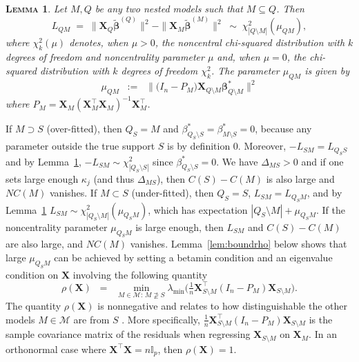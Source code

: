 \documentclass[bj,authoryear]{imsart}
\theoremstyle{plain}
\newtheorem{lem}[thm]{\textsc{Lemma}}
\newcommand{\I}{\mathbb{I}}
\newcommand{\M}{\mathcal{M}}
\newcommand{\bs}{\boldsymbol}
\begin{document}
\begin{lem}\label{lemma:s7}
    Let $M,Q$ be any two nested models such that $M \subseteq Q$. Then
$$
L_{QM}\;=\;\|\bs X_{Q}\tilde{\bs\beta}^{(Q)}\|^2-\|\bs X_{M}\tilde{\bs\beta}^{(M)}\|^2\;\sim\; \chi_{|Q\setminus M|}^2\left(\mu_{Q M}\right), 
$$
where $\chi_{k}^2(\mu)$ denotes, when $\mu>0$, the noncentral chi-squared distribution with $k$ degrees of freedom and noncentrality parameter $\mu$ and, when $\mu=0$, the chi-squared distribution with $k$ degrees of freedom $\chi_{k}^2$. The parameter $\mu_{QM}$ is given by \begin{equation}\label{eq:muQM}
    \mu_{QM}\;\;:=\;\;\|\big(I_n-P_M\big) \bs X_{Q\setminus M} \bs \beta^*_{Q\setminus M}\|^2
\end{equation}
where $P_M=\bs X_{M}\left(\bs X_{M}^{\top} \bs X_{M}\right)^{-1} \bs X_{M}^{\top}$.
\end{lem}

If $M\supset S$ (over-fitted), then $Q_S=M$ and $\beta^*_{Q_S\setminus S}=\beta^*_{M\setminus S}=0$, because any parameter outside the true support $S$ is by definition $0$. Moreover, $-L_{SM}=L_{Q_SS}$ and by Lemma~\ref{lemma:s7}, $-L_{SM}\sim \chi^2_{|Q_S\setminus S|}$ since $\beta^*_{Q_S\setminus S}=0$. We have $\Delta_{MS}>0$ and if one sets large enough $\kappa_j$ (and thus $\Delta_{MS}$), then $C(S)-C(M)$ is also large and $NC(M)$ vanishes. If $M\subset S$ (under-fitted), then $Q_S=S$, $L_{SM}=L_{Q_SM}$, and by Lemma~\ref{lemma:s7}
$L_{SM}\sim \chi^2_{|Q_S\setminus M|}(\mu_{Q_SM})$, which has expectation $|Q_S\setminus M|+\mu_{Q_SM}$.
If the noncentrality parameter $\mu_{Q_SM}$ is large enough, then $L_{SM}$ and $C(S)-C(M)$ are also large, and $NC(M)$ vanishes. Lemma~\ref{lem:boundrho} below shows that large $\mu_{Q_SM}$ can be achieved by setting a betamin condition and an eigenvalue condition on $\bs X$ involving the following quantity  
 \begin{equation}\label{eq:rhoX}
        \rho(\bs X)\;\;=\;\;\min_{M \in \M:\, M\not \supseteq S} \lambda_{\min}\big(\tfrac{1}{n} \boldsymbol{X}_{S \setminus M}^{\top}\left(I_n- P_M\right) \boldsymbol{X}_{S \setminus M}\big).
    \end{equation}
The quantity $\rho(\bs X)$ is nonnegative and relates to how distinguishable the other models $M\in \M$ are from $S$ \citep{infotheowainwright}.  More specifically, $\tfrac{1}{n} \boldsymbol{X}_{S \setminus M}^{\top}\left(I_n- P_M\right) \boldsymbol{X}_{S \setminus M}$ is the sample covariance matrix of the residuals when regressing $\boldsymbol{X}_{S \setminus M}$ on $\boldsymbol{X}_M$.
In an orthonormal case where $\bs X^{\top}\bs X=n\I_p$, then $\rho(\bs X)=1$.  
\end{document}
